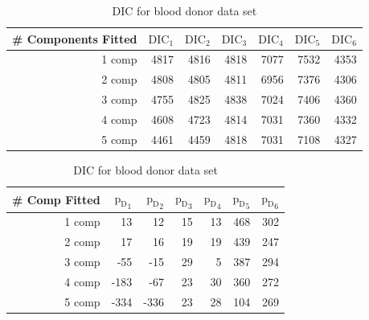 \begin{table}[!htb]
\centering
\captionsetup{justification=centering}
\caption{DIC for blood donor data set}
\label{table : dic_blood_donor}
\begin{tabular}{@{}rrrrrrr@{}}
\toprule
\# Components Fitted & $\text{DIC}_1$ & $\text{DIC}_2$ & $\text{DIC}_3$  & $\text{DIC}_4$  & $\text{DIC}_5$  & $\text{DIC}_6$  \\ \midrule
1 comp & 4817 & 4816 & 4818 & 7077 & 7532 & 4353 \\
2 comp & 4808 & 4805 & 4811 & 6956 & 7376 & 4306 \\
3 comp & 4755 & 4825 & 4838 & 7024 & 7406 & 4360 \\
4 comp & 4608 & 4723 & 4814 & 7031 & 7360 & 4332 \\
5 comp & 4461 & 4459 & 4818 & 7031 & 7108 & 4327 \\ \bottomrule
\end{tabular}
\begin{tabular}{@{}rrrrrrr@{}}
\toprule
\# Comp Fitted & ${\text{p}_\text{D}}_1$ & ${\text{p}_\text{D}}_2$ & ${\text{p}_\text{D}}_3$ & ${\text{p}_\text{D}}_4$ & ${\text{p}_\text{D}}_5$ & ${\text{p}_\text{D}}_6$ \\ \midrule
1 comp & 13 & 12 & 15 & 13 & 468 & 302 \\
2 comp & 17 & 16 & 19 & 19 & 439 & 247 \\
3 comp & -55 & -15 & 29 & 5 & 387 & 294 \\
4 comp & -183 & -67 & 23 & 30 & 360 & 272 \\
5 comp & -334 & -336 & 23 & 28 & 104 & 269 \\ \bottomrule
\end{tabular}
\end{table}

